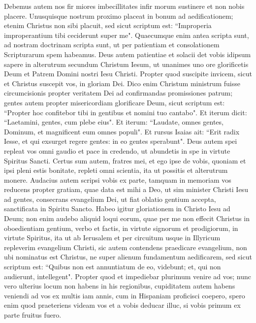 \begin{biblechapter}  
\verse Debemus autem nos fir miores imbecillitates infir morum sustinere et non nobis placere. 
\verse Unusquisque nostrum proximo placeat in bonum ad aedificationem; 
\verse etenim Christus non sibi placuit, sed sicut scriptum est: “Improperia improperantium tibi ceciderunt super me". 
\verse Quaecumque enim antea scripta sunt, ad nostram doctrinam scripta sunt, ut per patientiam et consolationem Scripturarum spem habeamus. 
\verse Deus autem patientiae et solacii det vobis idipsum sapere in alterutrum secundum Christum Iesum, 
\verse ut unanimes uno ore glorificetis Deum et Patrem Domini nostri Iesu Christi. 
\verse Propter quod suscipite invicem, sicut et Christus suscepit vos, in gloriam Dei. 
\verse Dico enim Christum ministrum fuisse circumcisionis propter veritatem Dei ad confirmandas promissiones patrum; 
\verse gentes autem propter misericordiam glorificare Deum, sicut scriptum est: “Propter hoc confitebor tibi in gentibus et nomini tuo cantabo". 
\verse Et iterum dicit: “Laetamini, gentes, cum plebe eius". 
\verse Et iterum: “Laudate, omnes gentes, Dominum, et magnificent eum omnes populi". 
\verse Et rursus Isaias ait: “Erit radix Iesse, et qui exsurget regere gentes: in eo gentes sperabunt". 
\verse Deus autem spei repleat vos omni gaudio et pace in credendo, ut abundetis in spe in virtute Spiritus Sancti. 
\verse Certus sum autem, fratres mei, et ego ipse de vobis, quoniam et ipsi pleni estis bonitate, repleti omni scientia, ita ut possitis et alterutrum monere.  
\verse Audacius autem scripsi vobis ex parte, tamquam in memoriam vos reducens propter gratiam, quae data est mihi a Deo, 
\verse ut sim minister Christi Iesu ad gentes, consecrans evangelium Dei, ut fiat oblatio gentium accepta, sanctificata in Spiritu Sancto. 
\verse Habeo igitur gloriationem in Christo Iesu ad Deum; 
\verse non enim audebo aliquid loqui eorum, quae per me non effecit Christus in oboedientiam gentium, verbo et factis, 
\verse in virtute signorum et prodigiorum, in virtute Spiritus, ita ut ab Ierusalem et per circuitum usque in Illyricum repleverim evangelium Christi, 
\verse sic autem contendens praedicare evangelium, non ubi nominatus est Christus, ne super alienum fundamentum aedificarem, 
\verse sed sicut scriptum est: “Quibus non est annuntiatum de eo, videbunt; et, qui non audierunt, intellegent". 
\verse Propter quod et impediebar plurimum venire ad vos; 
\verse nunc vero ulterius locum non habens in his regionibus, cupiditatem autem habens veniendi ad vos ex multis iam annis, 
\verse cum in Hispaniam proficisci coepero, spero enim quod praeteriens videam vos et a vobis deducar illuc, si vobis primum ex parte fruitus fuero. 

\end{biblechapter}
